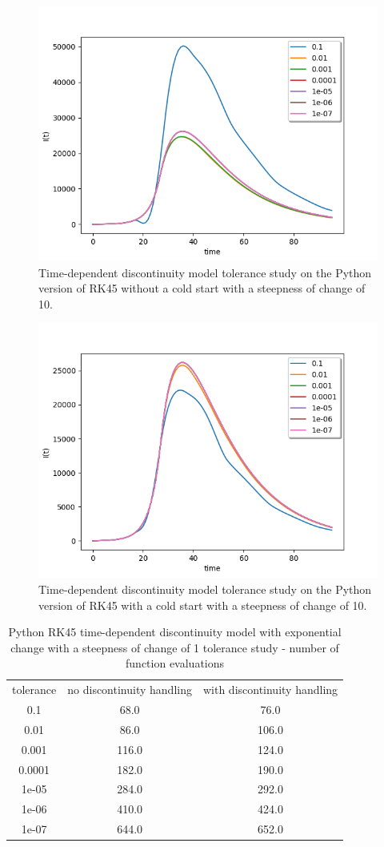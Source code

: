 \begin{figure}[H]
\centering
\includegraphics[width=0.7\linewidth]{./figures/exp_time_tol_rk45_no_event_10}
\caption{Time-dependent discontinuity model tolerance study on the Python version of RK45 without a cold start with a steepness of change of 10.}
\label{fig:exp_time_tol_rk45_no_event_10}
\end{figure}

\begin{figure}[H]
\centering
\includegraphics[width=0.7\linewidth]{./figures/exp_time_tol_rk45_event_10}
\caption{Time-dependent discontinuity model tolerance study on the Python version of RK45 with a cold start with a steepness of change of 10.}
\label{fig:exp_time_tol_rk45_event_10}
\end{figure}

\begin{table}[H]
\caption {Python RK45 time-dependent discontinuity model with exponential change with a steepness of change of 1 tolerance study - number of function evaluations} \label{tab:exp_time_tol_rk45_10} 
\begin{center}
\begin{tabular}{ c c c }
tolerance & no discontinuity handling & with discontinuity handling \\ 
0.1 & 68.0 & 76.0 \\
0.01 & 86.0 & 106.0 \\
0.001 & 116.0 & 124.0 \\
0.0001 & 182.0 & 190.0 \\
1e-05 & 284.0 & 292.0 \\
1e-06 & 410.0 & 424.0 \\
1e-07 & 644.0 & 652.0 \\
\end{tabular}
\end{center}
\end{table}



